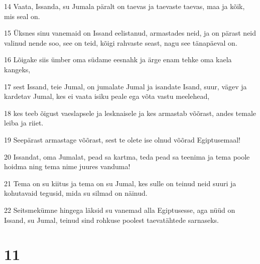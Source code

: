 \par 14 Vaata, Issanda, su Jumala päralt on taevas ja taevaste taevas, maa ja kõik, mis seal on.
\par 15 Üksnes sinu vanemaid on Issand eelistanud, armastades neid, ja on pärast neid valinud nende soo, see on teid, kõigi rahvaste seast, nagu see tänapäeval on.
\par 16 Lõigake siis ümber oma südame eesnahk ja ärge enam tehke oma kaela kangeks,
\par 17 sest Issand, teie Jumal, on jumalate Jumal ja isandate Isand, suur, vägev ja kardetav Jumal, kes ei vaata isiku peale ega võta vastu meelehead,
\par 18 kes teeb õigust vaeslapsele ja lesknaisele ja kes armastab võõrast, andes temale leiba ja riiet.
\par 19 Seepärast armastage võõrast, sest te olete ise olnud võõrad Egiptusemaal!
\par 20 Issandat, oma Jumalat, pead sa kartma, teda pead sa teenima ja tema poole hoidma ning tema nime juures vanduma!
\par 21 Tema on su kiitus ja tema on su Jumal, kes sulle on teinud neid suuri ja kohutavaid tegusid, mida su silmad on näinud.
\par 22 Seitsmekümne hingega läksid su vanemad alla Egiptusesse, aga nüüd on Issand, su Jumal, teinud sind rohkuse poolest taevatähtede sarnaseks.

\chapter{11}

